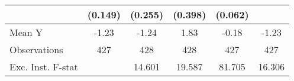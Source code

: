{\begin{tabular}{l*{5}{c}}
            &     (0.149)         &     (0.255)         &     (0.398)         &     (0.062)         &                     \\
\midrule
Mean Y      &       -1.23         &       -1.24         &        1.83         &       -0.18         &       -1.23         \\
Observations&         427         &         428         &         428         &         427         &         427         \\
Exc. Inst. F-stat&                     &      14.601         &      19.587         &      81.705         &      16.306         \\
\bottomrule
\end{tabular}
}
